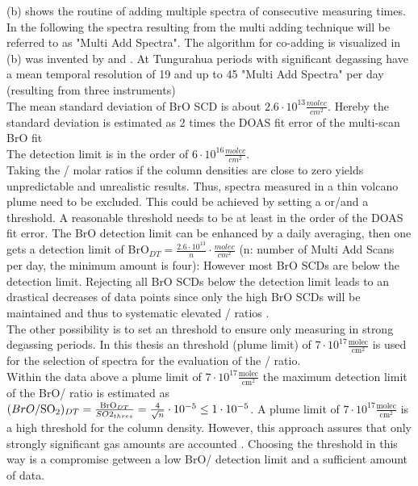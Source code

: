 (b) shows the routine of adding multiple spectra of consecutive measuring times. In the following the spectra resulting from the multi adding technique will be referred to as "Multi Add Spectra". The algorithm for co-adding is visualized in  (b) was invented by \citet{vogel2011volcanic} and \citet{lubcke2014bro}. At Tungurahua periods with significant degassing have a mean temporal resolution of 19 and up to 45 "Multi Add Spectra" per day (resulting from three instruments)\\

The mean standard deviation of BrO SCD is about $2.6\cdot10^{13} \frac{molec}{cm^{2}}$. Hereby the standard deviation is estimated as 2 times the DOAS fit error of the multi-scan BrO fit \citet{Stutz96} \\
%
The   detection limit is in the order of $6\cdot10^{16}\frac{molec}{cm^{2}}$.\\
%
Taking the / molar ratios if the column densities are close to zero yields unpredictable and unrealistic results. 
Thus, spectra measured in a thin volcano plume need to be excluded.
This could be achieved by setting a  or/and a  threshold. A reasonable  threshold needs to be at least in the order of the DOAS fit error. The BrO detection limit can be enhanced by a daily averaging, then one gets a detection limit of BrO$_{DT}=\frac{2.6\cdot10^{13}}{n}\cdot\frac{molec}{cm^{2}}$ (n: number of Multi Add Scans per day, the minimum amount is four): However most BrO SCDs are below the detection limit.
Rejecting all BrO SCDs below the detection limit leads to an drastical decreases of data points since only the high BrO SCDs will be maintained and thus to systematic elevated / ratios  \citep{lubcke2014bro}.\\
%
The other possibility is to set an  threshold to ensure only measuring in strong degassing periods. In this thesis an  threshold (plume limit) of $7\cdot 10^{17} \frac{\text{molec}}{\text{cm}^2}$ is used for the selection of spectra for the evaluation of the / ratio. \\
%
Within the data above a  plume limit of $7\cdot 10^{17} \frac{\text{molec}}{\text{cm}^2}$ the maximum detection limit of the BrO/ ratio is estimated as $(BrO/\ce{SO2})_{DT}    =    \frac{\ce{BrO}_{DT}}{SO2_{thres}}=\frac{4}{\sqrt{n}}\cdot10^{-5}     \leq     1\cdot10^{-5}$.
A plume limit of $7\cdot 10^{17} \frac{\text{molec}}{\text{cm}^2}$ is a high threshold for the column density. However, this approach assures that only strongly significant gas amounts are accounted \citep{lubcke2014bro}. Choosing the  threshold in this way is a compromise getween a low BrO/ detection limit and a sufficient amount of data.\\
